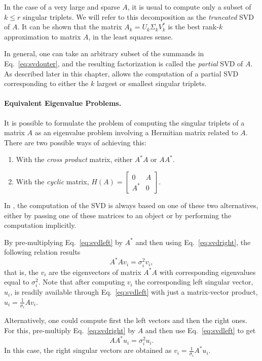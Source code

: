 In the case of a very large and sparse $A$, it is usual to compute only a subset of $k\leq r$ singular triplets. We will refer to this decomposition as the \emph{truncated} SVD of $A$. It can be shown that the matrix $A_k=U_k\Sigma_k V_k^*$ is the best rank-$k$ approximation to matrix $A$, in the least squares sense. 

In general, one can take an arbitrary subset of the summands in Eq.\ \ref{eq:svdouter}, and the resulting factorization is called the \emph{partial} SVD of $A$. As described later in this chapter, \slepc allows the computation of a partial SVD corresponding to either the $k$ largest or smallest singular triplets.

\paragraph{Equivalent Eigenvalue Problems.}

It is possible to formulate the problem of computing the singular triplets of a matrix $A$ as an eigenvalue problem involving a Hermitian matrix related to $A$. There are two possible ways of achieving this:
\begin{enumerate}
\item With the \emph{cross product} matrix, either $A^*A$ or $AA^*$.
\item With the \emph{cyclic} matrix, $H(A)=\left[\begin{smallmatrix}0&A\\A^*&0\end{smallmatrix}\right]$.
\end{enumerate}
In \slepc, the computation of the SVD is always based on one of these two alternatives, either by passing one of these matrices to an  object or by performing the computation implicitly.

By pre-multiplying Eq.\ \ref{eq:svdleft} by $A^*$ and then using Eq.\ \ref{eq:svdright}, the following relation results
\begin{equation}
\label{eq:eigleft}
A^*Av_i=\sigma_i^2v_i,
\end{equation}
that is, the $v_i$ are the eigenvectors of matrix $A^*A$ with corresponding eigenvalues equal to $\sigma_i^2$. Note that after computing $v_i$ the corresponding left singular vector, $u_i$, is readily available through Eq.\ \ref{eq:svdleft} with just a matrix-vector product, $u_i=\frac{1}{\sigma_i}Av_i$.

Alternatively, one could compute first the left vectors and then the right ones. For this, pre-multiply Eq.\ \ref{eq:svdright} by $A$ and then use Eq.\ \ref{eq:svdleft} to get
\begin{equation}
\label{eq:eigright}
AA^*u_i=\sigma_i^2u_i.
\end{equation}
In this case, the right singular vectors are obtained as $v_i=\frac{1}{\sigma_i}A^*u_i$.

